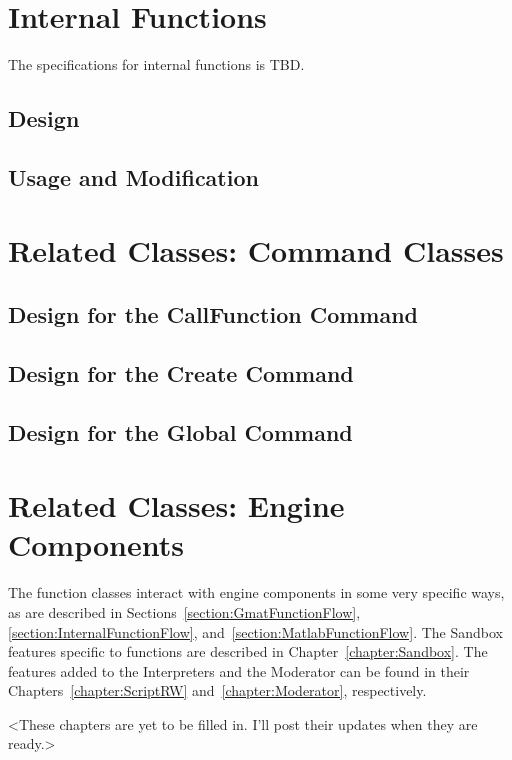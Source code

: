 \section{\label{section:InternalFunctions}Internal Functions}

The specifications for internal functions is TBD.

\subsection{\label{section:InternalFunctionDesign}Design}

\subsection{\label{section:InternalFunctionFlow}Usage and Modification}

\section{Related Classes: Command Classes}

\subsection{\label{section:CallFunctionDesign}Design for the CallFunction Command}



\subsection{\label{section:CreateCommandDesign}Design for the Create Command}



\subsection{\label{section:GlobalCommandDesign}Design for the Global Command}



\section{Related Classes: Engine Components}

The function classes interact with engine components in some very specific ways, as are described
in Sections~\ref{section:GmatFunctionFlow}, \ref{section:InternalFunctionFlow},
and~\ref{section:MatlabFunctionFlow}.  The Sandbox features specific to functions are described in
Chapter~\ref{chapter:Sandbox}.  The features added to the Interpreters and the Moderator can be
found in their Chapters~\ref{chapter:ScriptRW} and~\ref{chapter:Moderator}, respectively.

<These chapters are yet to be filled in.  I'll post their updates when they are ready.>

